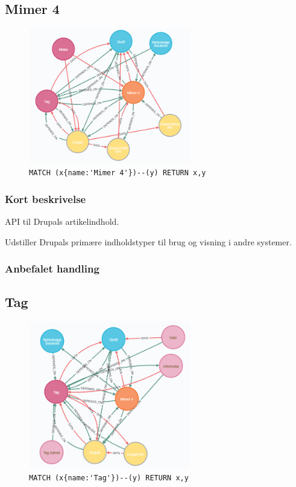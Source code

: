 \documentclass{article}
\begin{document}
\subsection{Mimer 4}
\begin{figure}[H]
\includegraphics[width=200pt]{Mimer4.PNG}
\cprotect\caption{\verb|MATCH (x{name:'Mimer 4'})--(y) RETURN x,y|}
\end{figure}
\subsubsection*{Kort beskrivelse}
API til Drupals artikelindhold.

Udstiller Drupals primære indholdstyper til brug og visning i andre systemer.
\subsubsection*{Anbefalet handling}



\subsection{Tag}
\begin{figure}[H]
\includegraphics[width=200pt]{Tag.PNG}
\cprotect\caption{\verb|MATCH (x{name:'Tag'})--(y) RETURN x,y|}
\end{figure}
\end{document}
